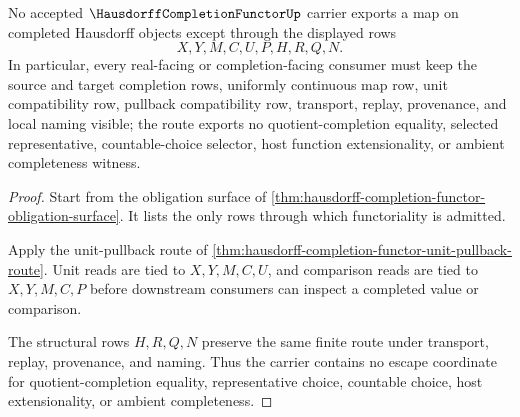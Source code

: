 \begin{theorem}
\label{thm:hausdorff-completion-functor-nonescape}
No accepted $\HausdorffCompletionFunctorUp$ carrier exports a map on completed Hausdorff objects except through the displayed rows
$$
X,Y,M,C,U,P,H,R,Q,N .
$$
In particular, every real-facing or completion-facing consumer must keep the source and target completion rows, uniformly continuous map row, unit compatibility row, pullback compatibility row, transport, replay, provenance, and local naming visible; the route exports no quotient-completion equality, selected representative, countable-choice selector, host function extensionality, or ambient completeness witness.
\end{theorem}
\begin{proof}
Start from the obligation surface of \autoref{thm:hausdorff-completion-functor-obligation-surface}. It lists the only rows through which functoriality is admitted.

Apply the unit-pullback route of \autoref{thm:hausdorff-completion-functor-unit-pullback-route}. Unit reads are tied to $X,Y,M,C,U$, and comparison reads are tied to $X,Y,M,C,P$ before downstream consumers can inspect a completed value or comparison.

The structural rows $H,R,Q,N$ preserve the same finite route under transport, replay, provenance, and naming. Thus the carrier contains no escape coordinate for quotient-completion equality, representative choice, countable choice, host extensionality, or ambient completeness.
\end{proof}


\begin{closurestatus}{\HausdorffCompletionFunctorUp}
  \theoryclosure{\seedClosure}
  \formalstatus{\formalTargetV}
\end{closurestatus}

